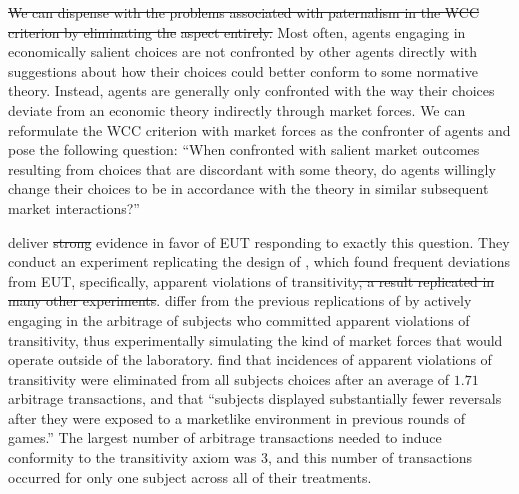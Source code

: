 \documentclass[11pt,a4paper]{report}
\providecommand{\DIFdeltex}[1]{{\protect\color{red}\sout{#1}}}                      %
\providecommand{\DIFaddbegin}{} %
\providecommand{\DIFaddend}{} %
\providecommand{\DIFdelbegin}{} %
\providecommand{\DIFdelend}{} %
\providecommand{\DIFdel}[1]{\texorpdfstring{\DIFdeltex{#1}}{}} %
\newcommand{\DIFscaledelfig}{0.5}
\newlength{\DIFdelgraphicswidth} %
\newlength{\DIFdelgraphicsheight} %
\newcommand{\DIFaddincludegraphics}[2][]{{\color{blue}\fbox{\DIFOincludegraphics[#1]{#2}}}} %
\newcommand{\DIFdelincludegraphics}[2][]{%
\sbox{\DIFdelgraphicsbox}{\DIFOincludegraphics[#1]{#2}}%
\settoboxwidth{\DIFdelgraphicswidth}{\DIFdelgraphicsbox} %
\settoboxtotalheight{\DIFdelgraphicsheight}{\DIFdelgraphicsbox} %
\scalebox{\DIFscaledelfig}{%
\parbox[b]{\DIFdelgraphicswidth}{\usebox{\DIFdelgraphicsbox}\\[-\baselineskip] \rule{\DIFdelgraphicswidth}{0em}}\llap{\resizebox{\DIFdelgraphicswidth}{\DIFdelgraphicsheight}{%
\setlength{\unitlength}{\DIFdelgraphicswidth}%
\begin{picture}(1,1)%
\thicklines\linethickness{2pt} %
{\color[rgb]{1,0,0}\put(0,0){\framebox(1,1){}}}%
{\color[rgb]{1,0,0}\put(0,0){\line( 1,1){1}}}%
{\color[rgb]{1,0,0}\put(0,1){\line(1,-1){1}}}%
\end{picture}%
}\hspace*{3pt}}} %
} %
\DeclareRobustCommand{\DIFaddbegin}{\DIFOaddbegin \let\includegraphics\DIFaddincludegraphics} %
\DeclareRobustCommand{\DIFaddend}{\DIFOaddend \let\includegraphics\DIFOincludegraphics} %
\DeclareRobustCommand{\DIFdelbegin}{\DIFOdelbegin \let\includegraphics\DIFdelincludegraphics} %
\DeclareRobustCommand{\DIFdelend}{\DIFOaddend \let\includegraphics\DIFOincludegraphics} %
\begin{document}
\DIFdelbegin \DIFdel{We can dispense with the problems associated with paternalism in the WCC criterion by eliminating the }%
\DIFdel{aspect entirely. }\DIFdelend Most often, agents engaging in economically salient choices are not confronted by other agents directly with suggestions about how their choices could better conform to some normative theory.
Instead, agents are generally only confronted with the way their choices deviate from an economic theory indirectly through market forces.
We can reformulate the WCC criterion with market forces as the confronter of agents and pose the following question:
\DIFdelbegin %
\DIFdelend \DIFaddbegin \enquote{When confronted with salient market outcomes resulting from choices that are discordant with some theory, do agents willingly change their choices to be in accordance with the theory in similar subsequent market interactions?}
\DIFaddend 

\textcite{Chu1990} deliver \DIFdelbegin \DIFdel{strong }\DIFdelend evidence in favor of EUT responding to exactly this question.
They conduct an experiment replicating the design of \textcite{Grether1979}, which found frequent deviations from EUT, specifically, apparent violations of transitivity\DIFdelbegin \DIFdel{, a result replicated in many other experiments}\DIFdelend .
\textcite{Chu1990} differ from the previous replications of \textcite{Grether1979} by actively engaging in the arbitrage of subjects who committed apparent violations of transitivity, thus experimentally simulating the kind of market forces that would operate outside of the laboratory.
\textcite[910]{Chu1990} find that incidences of apparent violations of transitivity were eliminated from all subjects choices after an average of $1.71$ arbitrage transactions, and that \enquote{subjects displayed substantially fewer reversals  after they were exposed to a marketlike environment in previous rounds of games.}
The largest number of arbitrage transactions needed to induce conformity to the transitivity axiom was $3$, and this number of transactions occurred for only one subject across all of their treatments.
\end{document}
